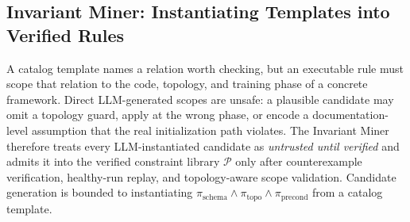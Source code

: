 \documentclass[sigconf,nonacm]{acmart}
\begin{document}
\subsection{Invariant Miner: Instantiating Templates into Verified Rules}
\label{subsec:invariant_miner}

A catalog template names a relation worth checking, but an executable rule must
scope that relation to the code, topology, and training phase of a concrete
framework. Direct LLM-generated scopes are unsafe: a plausible candidate may
omit a topology guard, apply at the wrong phase, or encode a documentation-level
assumption that the real initialization path violates. The Invariant Miner
therefore treats every LLM-instantiated candidate as \emph{untrusted until
verified} and admits it into the verified constraint library $\mathcal{P}$ only
after counterexample verification, healthy-run replay, and topology-aware scope
validation. Candidate generation is bounded to instantiating
$\pi_{\text{schema}} \wedge \pi_{\text{topo}} \wedge
\pi_{\text{precond}}$ from a catalog template.
\end{document}
